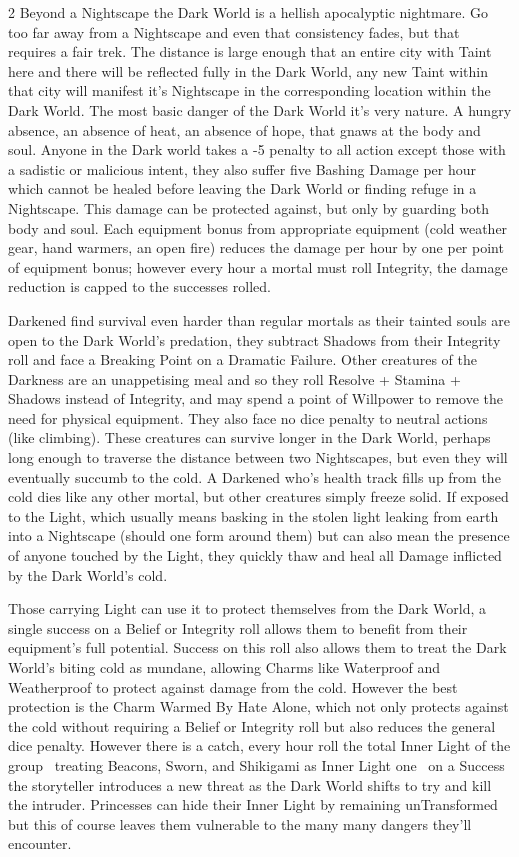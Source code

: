 \begin{multicols}{2}
Beyond a Nightscape the Dark World is a hellish apocalyptic nightmare. Go too far away from a Nightscape and even that consistency fades, but that requires a fair trek. The distance is large enough that an entire city with Taint here and there will be reflected fully in the Dark World, any new Taint within that city will manifest it's Nightscape in the corresponding location within the Dark World. The most basic danger of the Dark World it's very nature. A hungry absence, an absence of heat, an absence of hope, that gnaws at the body and soul. Anyone in the Dark world takes a -5 penalty to all action except those with a sadistic or malicious intent, they also suffer five Bashing Damage per hour which cannot be healed before leaving the Dark World or finding refuge in a Nightscape. This damage can be protected against, but only by guarding both body and soul. Each equipment bonus from appropriate equipment (cold weather gear, hand warmers, an open fire) reduces the damage per hour by one per point of equipment bonus; however every hour a mortal must roll Integrity, the damage reduction is capped to the successes rolled. 

Darkened find survival even harder than regular mortals as their tainted souls are open to the Dark World's predation, they subtract Shadows from their Integrity roll and face a Breaking Point on a Dramatic Failure. Other creatures of the Darkness are an unappetising meal and so they roll Resolve + Stamina + Shadows instead of Integrity, and may spend a point of Willpower to remove the need for physical equipment. They also face no dice penalty to neutral actions (like climbing). These creatures can survive longer in the Dark World, perhaps long enough to traverse the distance between two Nightscapes, but even they will eventually succumb to the cold. A Darkened who's health track fills up from the cold dies like any other mortal, but other creatures simply freeze solid. If exposed to the Light, which usually means basking in the stolen light leaking from earth into a Nightscape (should one form around them) but can also mean the presence of anyone touched by the Light, they quickly thaw and heal all Damage inflicted by the Dark World's cold. 

Those carrying Light can use it to protect themselves from the Dark World, a single success on a Belief or Integrity roll allows them to benefit from their equipment's full potential. Success on this roll also allows them to treat the Dark World's biting cold as mundane, allowing Charms like Waterproof and Weatherproof to protect against damage from the cold. However the best protection is the Charm Warmed By Hate Alone, which not only protects against the cold without requiring a Belief or Integrity roll but also reduces the general dice penalty. However there is a catch, every hour roll the total Inner Light of the group \textemdash\, treating Beacons, Sworn, and Shikigami as Inner Light one \textemdash\, on a Success the storyteller introduces a new threat as the Dark World shifts to try and kill the intruder. Princesses can hide their Inner Light by remaining unTransformed but this of course leaves them vulnerable to the many many dangers they'll encounter. 


\end{multicols}
